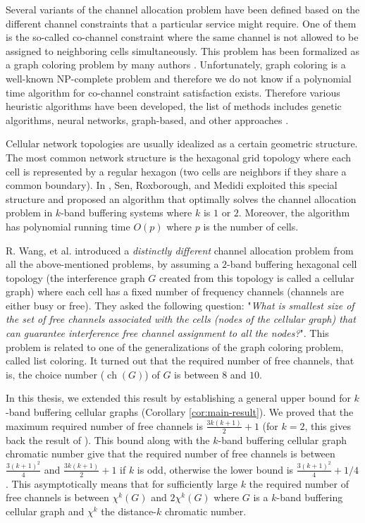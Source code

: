 \documentclass[a4paper, 12pt]{article}
\DeclareMathOperator*{\ch}{ch}
\begin{document}
Several variants of the channel allocation problem have been defined based on the different channel constraints that a particular service might require. One of them is the so-called co-channel constraint where the same channel is not allowed to be assigned to neighboring cells simultaneously. This problem has been formalized as a graph coloring problem by many authors \cite{1456167}. Unfortunately, graph coloring is a well-known NP-complete problem \cite{Kar72} and therefore we do not know if a polynomial time algorithm for co-channel constraint satisfaction exists. Therefore various heuristic algorithms have been developed, the list of methods includes genetic algorithms, neural networks, graph-based, and other approaches \cite{Audhya:2011:SCA:1988563.1988571}.

Cellular network topologies are usually idealized as a certain geometric structure. The most common network structure is the hexagonal grid topology where each cell is represented by a regular hexagon (two cells are neighbors if they share a common boundary). In \cite{662943}, Sen, Roxborough, and Medidi exploited this special structure and proposed an algorithm that optimally solves the channel allocation problem in $k$-band buffering systems where $k$ is $1$ or $2$. Moreover, the algorithm has polynomial running time $O(p)$ where $p$ is the number of cells.

R. Wang, et al. \cite{7248845} introduced a \textit{distinctly different} channel allocation problem from all the above-mentioned problems, by assuming a $2$-band buffering hexagonal cell topology (the interference graph $G$ created from this topology is called a cellular graph) where each cell has a fixed number of frequency channels (channels are either busy or free). They asked the following question: "\textit{What is smallest size of the set of free channels associated with the cells (nodes of the cellular graph) that can guarantee interference free channel assignment to all the nodes?}". This problem is related to one of the generalizations of the graph coloring problem, called list coloring. It turned out that the required number of free channels, that is, the choice number ($\ch(G)$) of $G$ is between $8$ and $10$.

In this thesis, we extended this result by establishing a general upper bound for $k$-band buffering cellular graphs (Corollary \ref{cor:main-result}). We proved that the maximum required number of free channels is $\frac{3k(k+1)}{2}+1$ (for $k=2$, this gives back the result of \cite{7248845}). This bound along with the $k$-band buffering cellular graph chromatic number \cite{662943} give that the required number of free channels is between $\frac{3(k+1)^2}{4}$ and $\frac{3k(k+1)}{2}+1$ if $k$ is odd, otherwise the lower bound is $\frac{3(k+1)^2}{4} + 1/4$. This asymptotically means that for sufficiently large $k$ the required number of free channels is between $\chi^k(G)$ and $2 \chi^k(G)$ where $G$ is a $k$-band buffering cellular graph and $\chi^k$ the distance-$k$ chromatic number.
\end{document}
